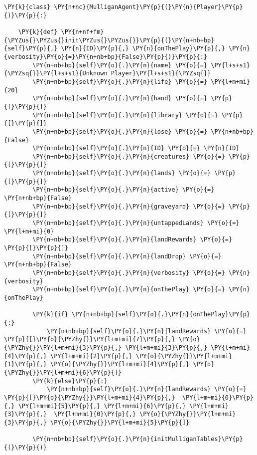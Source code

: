 \begin{Verbatim}[commandchars=\\\{\}]
\PY{k}{class} \PY{n+nc}{MulliganAgent}\PY{p}{(}\PY{n}{Player}\PY{p}{)}\PY{p}{:}

    \PY{k}{def} \PY{n+nf+fm}{\PYZus{}\PYZus{}init\PYZus{}\PYZus{}}\PY{p}{(}\PY{n+nb+bp}{self}\PY{p}{,} \PY{n}{ID}\PY{p}{,} \PY{n}{onThePlay}\PY{p}{,} \PY{n}{verbosity}\PY{o}{=}\PY{n+nb+bp}{False}\PY{p}{)}\PY{p}{:}
        \PY{n+nb+bp}{self}\PY{o}{.}\PY{n}{name} \PY{o}{=} \PY{l+s+s1}{\PYZsq{}}\PY{l+s+s1}{Unknown Player}\PY{l+s+s1}{\PYZsq{}}
        \PY{n+nb+bp}{self}\PY{o}{.}\PY{n}{life} \PY{o}{=} \PY{l+m+mi}{20}
        \PY{n+nb+bp}{self}\PY{o}{.}\PY{n}{hand} \PY{o}{=} \PY{p}{[}\PY{p}{]}
        \PY{n+nb+bp}{self}\PY{o}{.}\PY{n}{library} \PY{o}{=} \PY{p}{[}\PY{p}{]}
        \PY{n+nb+bp}{self}\PY{o}{.}\PY{n}{lose} \PY{o}{=} \PY{n+nb+bp}{False}
        \PY{n+nb+bp}{self}\PY{o}{.}\PY{n}{ID} \PY{o}{=} \PY{n}{ID}
        \PY{n+nb+bp}{self}\PY{o}{.}\PY{n}{creatures} \PY{o}{=} \PY{p}{[}\PY{p}{]}
        \PY{n+nb+bp}{self}\PY{o}{.}\PY{n}{lands} \PY{o}{=} \PY{p}{[}\PY{p}{]}
        \PY{n+nb+bp}{self}\PY{o}{.}\PY{n}{active} \PY{o}{=} \PY{n+nb+bp}{False}
        \PY{n+nb+bp}{self}\PY{o}{.}\PY{n}{graveyard} \PY{o}{=} \PY{p}{[}\PY{p}{]}
        \PY{n+nb+bp}{self}\PY{o}{.}\PY{n}{untappedLands} \PY{o}{=} \PY{l+m+mi}{0}
        \PY{n+nb+bp}{self}\PY{o}{.}\PY{n}{landRewards} \PY{o}{=} \PY{p}{[}\PY{p}{]}
        \PY{n+nb+bp}{self}\PY{o}{.}\PY{n}{landDrop} \PY{o}{=} \PY{n+nb+bp}{False}
        \PY{n+nb+bp}{self}\PY{o}{.}\PY{n}{verbosity} \PY{o}{=} \PY{n}{verbosity}
        \PY{n+nb+bp}{self}\PY{o}{.}\PY{n}{onThePlay} \PY{o}{=} \PY{n}{onThePlay}

        \PY{k}{if} \PY{n+nb+bp}{self}\PY{o}{.}\PY{n}{onThePlay}\PY{p}{:}
            \PY{n+nb+bp}{self}\PY{o}{.}\PY{n}{landRewards} \PY{o}{=} \PY{p}{[}\PY{o}{\PYZhy{}}\PY{l+m+mi}{7}\PY{p}{,} \PY{o}{\PYZhy{}}\PY{l+m+mi}{3}\PY{p}{,} \PY{l+m+mi}{3}\PY{p}{,} \PY{l+m+mi}{4}\PY{p}{,} \PY{l+m+mi}{2}\PY{p}{,} \PY{o}{\PYZhy{}}\PY{l+m+mi}{1}\PY{p}{,} \PY{o}{\PYZhy{}}\PY{l+m+mi}{4}\PY{p}{,} \PY{o}{\PYZhy{}}\PY{l+m+mi}{6}\PY{p}{]}
        \PY{k}{else}\PY{p}{:}
            \PY{n+nb+bp}{self}\PY{o}{.}\PY{n}{landRewards} \PY{o}{=} \PY{p}{[}\PY{o}{\PYZhy{}}\PY{l+m+mi}{4}\PY{p}{,}  \PY{l+m+mi}{0}\PY{p}{,} \PY{l+m+mi}{5}\PY{p}{,} \PY{l+m+mi}{6}\PY{p}{,} \PY{l+m+mi}{3}\PY{p}{,}  \PY{l+m+mi}{0}\PY{p}{,} \PY{o}{\PYZhy{}}\PY{l+m+mi}{3}\PY{p}{,} \PY{o}{\PYZhy{}}\PY{l+m+mi}{5}\PY{p}{]}

        \PY{n+nb+bp}{self}\PY{o}{.}\PY{n}{initMulliganTables}\PY{p}{(}\PY{p}{)}


\end{Verbatim}

